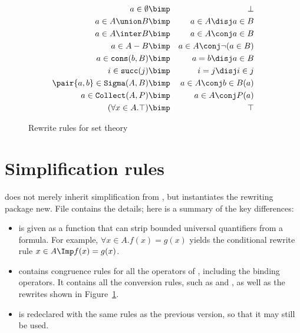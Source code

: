 \begin{figure}
\begin{eqnarray*}
  a\in \emptyset        & \bimp &  \bot\\
  a \in A \union B      & \bimp &  a\in A \disj a\in B\\
  a \in A \inter B      & \bimp &  a\in A \conj a\in B\\
  a \in A-B             & \bimp &  a\in A \conj \neg (a\in B)\\
  a \in {\tt cons}(b,B) & \bimp &  a=b \disj a\in B\\
  i \in {\tt succ}(j)   & \bimp &  i=j \disj i\in j\\
  \pair{a,b}\in {\tt Sigma}(A,B)
                        & \bimp &  a\in A \conj b\in B(a)\\
  a \in {\tt Collect}(A,P)      & \bimp &  a\in A \conj P(a)\\
  (\forall x \in A. \top)       & \bimp &  \top
\end{eqnarray*}
\caption{Rewrite rules for set theory} \label{ZF-simpdata}
\end{figure}


\section{Simplification rules}
{\ZF} does not merely inherit simplification from \FOL, but instantiates
the rewriting package new.  File  contains the
details; here is a summary of the key differences:
\begin{itemize}
\item 
{} is given as a function that can
strip bounded universal quantifiers from a formula.  For example, $\forall
x\in A.f(x)=g(x)$ yields the conditional rewrite rule $x\in A \Imp
f(x)=g(x)$.
\item
{} contains congruence rules for all the operators of
{\ZF}, including the binding operators.  It contains all the conversion
rules, such as  and , as well as the
rewrites shown in Figure~\ref{ZF-simpdata}.
\item
{} is redeclared with the same {\FOL} rules as the
previous version, so that it may still be used.  
\end{itemize}


